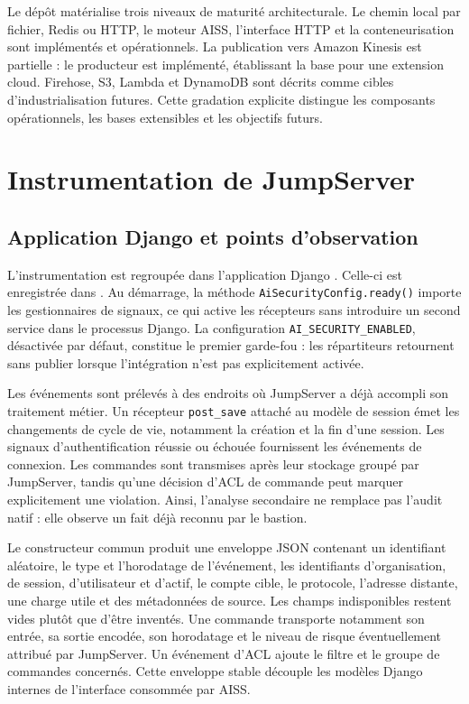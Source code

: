 \documentclass[11pt,a4paper,oneside]{report}
\theoremstyle{definition}
\theoremstyle{plain}
\begin{document}
Le dépôt matérialise trois niveaux de maturité architecturale. Le chemin local
par fichier, Redis ou HTTP, le moteur AISS, l'interface HTTP et la
conteneurisation sont implémentés et opérationnels. La publication vers Amazon
Kinesis est partielle : le producteur est implémenté, établissant la base pour
une extension cloud. Firehose, S3, Lambda et DynamoDB sont décrits comme
cibles d'industrialisation futures. Cette gradation explicite distingue les
composants opérationnels, les bases extensibles et les objectifs futurs.

\section{Instrumentation de JumpServer}

\subsection{Application Django et points d'observation}

L'instrumentation est regroupée dans l'application Django
. Celle-ci est enregistrée dans
. Au démarrage, la méthode
\texttt{AiSecurityConfig.ready()} importe les gestionnaires de signaux, ce qui
active les récepteurs sans introduire un second service dans le processus
Django. La configuration \texttt{AI\_SECURITY\_ENABLED}, désactivée par
défaut, constitue le premier garde-fou : les répartiteurs retournent sans
publier lorsque l'intégration n'est pas explicitement activée.

Les événements sont prélevés à des endroits où JumpServer a déjà accompli son
traitement métier. Un récepteur \texttt{post\_save} attaché au modèle de
session émet les changements de cycle de vie, notamment la création et la fin
d'une session. Les signaux d'authentification réussie ou échouée fournissent
les événements de connexion. Les commandes sont transmises après leur
stockage groupé par JumpServer, tandis qu'une décision d'ACL de commande peut
marquer explicitement une violation. Ainsi, l'analyse secondaire ne remplace
pas l'audit natif : elle observe un fait déjà reconnu par le bastion.

Le constructeur commun produit une enveloppe JSON contenant un identifiant
aléatoire, le type et l'horodatage de l'événement, les identifiants
d'organisation, de session, d'utilisateur et d'actif, le compte cible, le
protocole, l'adresse distante, une charge utile et des métadonnées de source.
Les champs indisponibles restent vides plutôt que d'être inventés. Une
commande transporte notamment son entrée, sa sortie encodée, son horodatage et
le niveau de risque éventuellement attribué par JumpServer. Un événement
d'ACL ajoute le filtre et le groupe de commandes concernés. Cette enveloppe
stable découple les modèles Django internes de l'interface consommée par
AISS.
\end{document}
